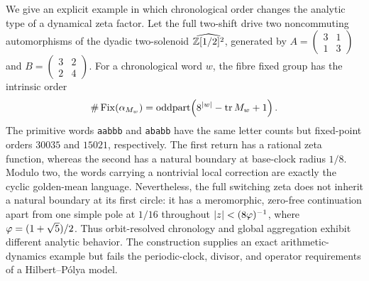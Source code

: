 We give an explicit example in which chronological order changes the analytic
type of a dynamical zeta factor.  Let the full two-shift drive two
noncommuting automorphisms of the dyadic two-solenoid
\(\widehat{\mathbb{Z}[1/2]^2}\), generated by
\(A=\left(\begin{smallmatrix}3&1\\1&3\end{smallmatrix}\right)\) and
\(B=\left(\begin{smallmatrix}3&2\\2&4\end{smallmatrix}\right)\).
For a chronological word \(w\), the fibre fixed group has the intrinsic
order
\[
 \#\operatorname{Fix}(\alpha_{M_w})
 =\operatorname{oddpart}\!\left(8^{|w|}-\operatorname{tr} M_w+1\right).
\]
The primitive words \texttt{aabbb} and \texttt{ababb} have the same letter
counts but fixed-point orders \(30035\) and \(15021\), respectively.  The
first return has a rational zeta function, whereas the second has a natural
boundary at base-clock radius \(1/8\).  Modulo two, the words carrying a
nontrivial local correction are exactly the cyclic golden-mean language.
Nevertheless, the full switching zeta does not inherit a natural boundary at
its first circle: it has a meromorphic, zero-free continuation apart from one
simple pole at \(1/16\) throughout
\(|z|<(8\varphi)^{-1}\), where
\(\varphi=(1+\sqrt5)/2\).  Thus orbit-resolved chronology and global
aggregation exhibit different analytic behavior.  The construction supplies
an exact arithmetic-dynamics example but fails the periodic-clock, divisor,
and operator requirements of a Hilbert--P\'olya model.
